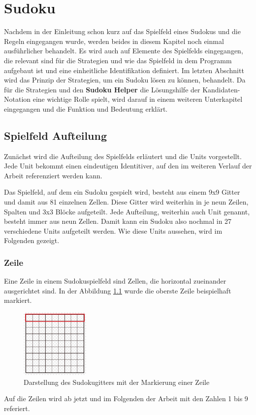 

\chapter{Sudoku}
Nachdem in der Einleitung schon kurz auf das Spielfeld eines Sudokus und die Regeln eingegangen wurde, werden beides in diesem Kapitel noch einmal ausführlicher behandelt. Es wird auch auf Elemente des Spielfelds eingegangen, die relevant sind für die Strategien und wie das Spielfeld in dem Programm aufgebaut ist und eine einheitliche Identifikation definiert. Im letzten Abschnitt wird das Prinzip der Strategien, um ein Sudoku lösen zu können, behandelt. Da für die Strategien und den \textbf{Sudoku Helper} die Lösungshilfe der Kandidaten-Notation eine wichtige Rolle spielt, wird darauf in einem weiteren Unterkapitel eingegangen und die Funktion und Bedeutung erklärt.



\section{Spielfeld Aufteilung}
Zunächst wird die Aufteilung des Spielfelds erläutert und die Units vorgestellt. Jede Unit bekommt einen eindeutigen Identitiver, auf den im weiteren Verlauf der Arbeit referenziert werden kann.

Das Spielfeld, auf dem ein Sudoku gespielt wird, besteht aus einem 9x9 Gitter und damit aus 81 einzelnen Zellen. Diese Gitter wird weiterhin in je neun Zeilen, Spalten und 3x3 Blöcke aufgeteilt. Jede Aufteilung, weiterhin auch Unit genannt, besteht immer aus neun Zellen. Damit kann ein Sudoku also nochmal in 27 verschiedene Units aufgeteilt werden. Wie diese Units aussehen, wird im Folgenden gezeigt. \cite{sudopedia_2022}

\subsection{Zeile}
Eine Zeile in einem Sudokuspielfeld sind Zellen, die horizontal zueinander ausgerichtet sind. In der Abbildung \ref{fig:SudokugitterZeile} wurde die oberste Zeile beispielhaft markiert.
\begin{figure}[htbp]
	\centering
	\includegraphics[width=0.3\textwidth]{images/sudokugitterZeile.jpg}
	\caption{Darstellung des Sudokugitters mit der Markierung einer Zeile}
	\label{fig:SudokugitterZeile}
\end{figure}
Auf die Zeilen wird ab jetzt und im Folgenden der Arbeit mit den Zahlen 1 bis 9 referiert. 

